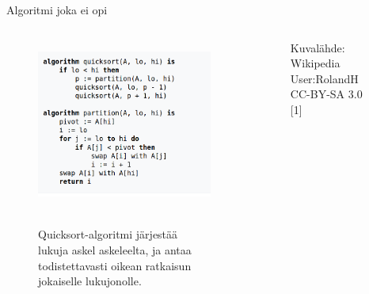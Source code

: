 \documentclass[presentation]{beamer}
\begin{document}
\begin{frame}{Algoritmi joka ei opi}
	\begin{columns}[]
			\centering
			\begin{figure}
				\includegraphics[width=\textwidth]{quicksort.png} \
				\caption*{Quicksort-algoritmi järjestää lukuja askel askeleelta, ja antaa todistettavasti oikean ratkaisun jokaiselle lukujonolle.}
			\end{figure}
		    \centering
		    \begin{figure}
		        \caption*{Kuvalähde: Wikipedia User:RolandH CC-BY-SA 3.0 [1] }
		    \end{figure}
	\end{columns}
\end{frame}
\end{document}
